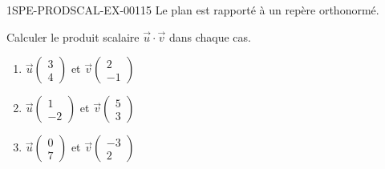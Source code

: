 \begin{exercice}{1SPE-PRODSCAL-EX-001}{1}{5}
Le plan est rapporté à un repère orthonormé.

Calculer le produit scalaire $\vec{u} \cdot \vec{v}$ dans chaque cas.
\begin{enumerate}
  \item $\vec{u}\begin{pmatrix} 3 \\ 4 \end{pmatrix}$ et $\vec{v}\begin{pmatrix} 2 \\ -1 \end{pmatrix}$
  \item $\vec{u}\begin{pmatrix} 1 \\ -2 \end{pmatrix}$ et $\vec{v}\begin{pmatrix} 5 \\ 3 \end{pmatrix}$
  \item $\vec{u}\begin{pmatrix} 0 \\ 7 \end{pmatrix}$ et $\vec{v}\begin{pmatrix} -3 \\ 2 \end{pmatrix}$
\end{enumerate}
\end{exercice}
